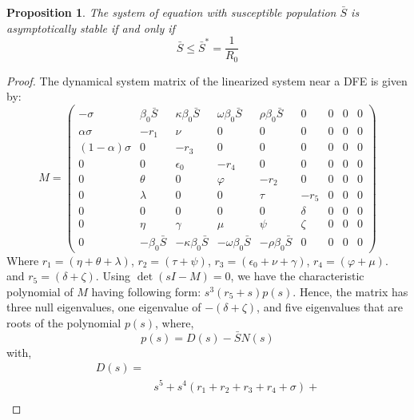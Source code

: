 \documentclass[10pt]{wlscirep}
\newtheorem{proposition}{Proposition}
\begin{document}
%
%
\begin{proposition}
The system of equation with susceptible population $\bar{S}$ is asymptotically stable if and only if
\begin{equation}
\bar{S} \leq \bar{S}^* = \frac{1}{R_0}
\nonumber
\end{equation}
\label{PROPOSITION-1}
\end{proposition}
\begin{proof}
The dynamical system matrix of the linearized system near a DFE is given by:
\begin{equation}
M = 
\begin{pmatrix}
-\sigma & \beta_0 \bar{S}& \kappa \beta_0 \bar{S}& \omega \beta_0 \bar{S}& \rho \beta_0 \bar{S}& 0 &0 & 0 &0 \\
\alpha \sigma & -r_1  & \nu & 0 & 0 & 0 &0 & 0 &0 \\
\left( 1- \alpha \right) \sigma & 0 & -r_3 & 0 & 0 & 0 &0 & 0 &0 \\
0 & 0 & \epsilon_0 & -r_4  & 0 & 0 &0 & 0 &0 \\
0 & \theta & 0 & \varphi & -r_2  & 0 &0 & 0 &0 \\
0 & \lambda & 0 & 0 & \tau & -r_5 &0 & 0 &0 \\
0 & 0 & 0 & 0 & 0 & \delta &0 & 0 &0 \\
0 & \eta & \gamma & \mu & \psi & \zeta &0 & 0 &0 \\
0 & -\beta_0 \bar{S}& -\kappa \beta_0 \bar{S}& -\omega \beta_0 \bar{S}& -\rho \beta_0 \bar{S}& 0 &0 & 0 &0
\end{pmatrix}
\nonumber
\end{equation}
Where $r_1 = \left( \eta + \theta + \lambda \right) $, $r_2 = \left( \tau + \psi \right) $, $r_3 = \left( \epsilon_0 + \nu + \gamma\right) $, $r_4 =  \left( \varphi + \mu\right)$. and $r_5=\left( \delta + \zeta\right)$. Using $\det(sI-M) = 0$, we have the characteristic polynomial of $M$ having following form:  $s^{3} \left(r_{5} + s\right) p(s)$. Hence, the matrix has three null eigenvalues, one eigenvalue of $-\left( \delta + \zeta\right)$, and five eigenvalues that are roots of the polynomial $p(s)$, where,
\begin{equation}
p(s) = D(s) - \bar{S}N(s)
\nonumber
\end{equation}
%
with, 
\begin{equation}
\begin{split}
D(s) = \\
& s^{5} + s^{4} \left(r_{1} + r_{2} + r_{3} + r_{4} + \sigma\right) + \\

\end{split}
\end{equation}
\end{proof}
\end{document}
